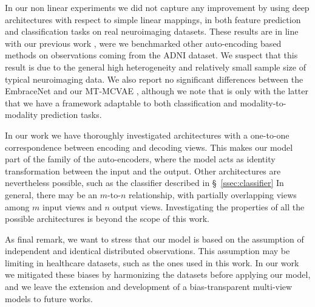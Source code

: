 In our non linear experiments we did not capture any improvement by using deep architectures with respect to simple linear mappings,
in both feature prediction  and classification tasks  on real neuroimaging datasets.
These results are in line with our previous work \citep{Antelmi2019}, were we benchmarked other auto-encoding based methods on observations coming from the ADNI dataset.
We suspect that this result is due to the general high heterogeneity and relatively small sample size of typical neuroimaging data.
We also report no significant differences between the EmbraceNet and our MT-MCVAE ,
although we note that is only with the latter that we have a framework adaptable to both classification and modality-to-modality prediction tasks.

In our work we have thoroughly investigated architectures with a one-to-one correspondence between encoding and decoding views.
This makes our model part of the family of the auto-encoders, where the model acts as identity transformation between the input and the output.
Other architectures are nevertheless possible, such as the classifier described in \S~\ref{ssec:classifier}
In general, there may be an $m$-to-$n$ relationship, with partially overlapping views among $m$ input views and $n$ output views.
Investigating the properties of all the possible architectures is beyond the scope of this work.

As final remark, we want to stress that our model is based on the assumption of independent and identical distributed observations.
This assumption may be limiting in healthcare datasets, such as the ones used in this work.
In our work we mitigated these biases by harmonizing the datasets before applying our model, and we leave the extension and development of a bias-transparent multi-view models to future works.

